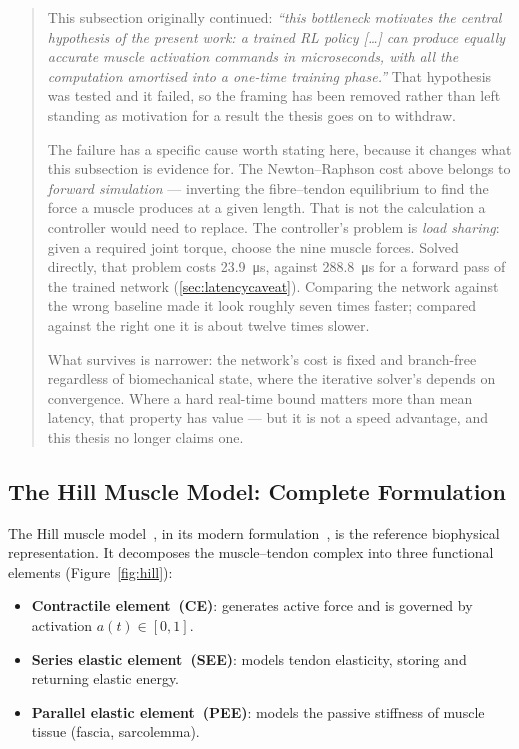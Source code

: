 \begin{quote}
\small
This subsection originally continued: \emph{``this bottleneck motivates the
central hypothesis of the present work: a trained RL policy [\ldots] can produce
equally accurate muscle activation commands in microseconds, with all the
computation amortised into a one-time training phase.''} That hypothesis was
tested and it failed, so the framing has been removed rather than left standing
as motivation for a result the thesis goes on to withdraw.

The failure has a specific cause worth stating here, because it changes what this
subsection is evidence for. The Newton--Raphson cost above belongs to
\emph{forward simulation} --- inverting the fibre--tendon equilibrium to find the
force a muscle produces at a given length. That is not the calculation a
controller would need to replace. The controller's problem is \emph{load
sharing}: given a required joint torque, choose the nine muscle forces. Solved
directly, that problem costs \SI{23.9}{\micro\second}, against
\SI{288.8}{\micro\second} for a forward pass of the trained network
(\cref{sec:latencycaveat}). Comparing the network against the wrong baseline made
it look roughly seven times faster; compared against the right one it is about
twelve times slower.

What survives is narrower: the network's cost is fixed and branch-free regardless
of biomechanical state, where the iterative solver's depends on convergence.
Where a hard real-time bound matters more than mean latency, that property has
value --- but it is not a speed advantage, and this thesis no longer claims one.
\end{quote}

\subsection{The Hill Muscle Model: Complete Formulation}
\label{sec:hill}

The Hill muscle model~\parencite{Hill1938}, in its modern
formulation~\parencite{Zajac1989, Millard2013}, is the reference biophysical
representation. It decomposes the muscle--tendon complex into three functional
elements (Figure~\ref{fig:hill}):

\begin{itemize}
  \item \textbf{Contractile element~(CE)}: generates active force and is governed by
        activation $a(t) \in [0,1]$.
  \item \textbf{Series elastic element~(SEE)}: models tendon elasticity,
        storing and returning elastic energy.
  \item \textbf{Parallel elastic element~(PEE)}: models the passive stiffness
        of muscle tissue (fascia, sarcolemma).
\end{itemize}

